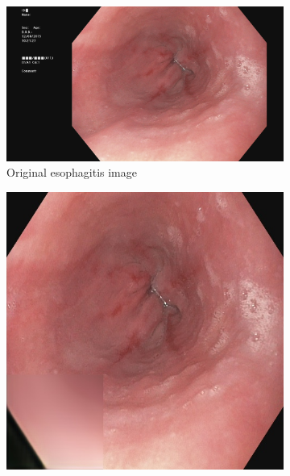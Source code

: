         \begin{figure}[t]
        \tiny
		\begin{subfigure}[t]{\myfigsizethree}
            \centering
            \includegraphics[height=\textwidth ,width=\textwidth]{experiments/figures/512/orig.jpg}
            \caption{Original esophagitis image}    
            \label{fig:ORIG_512}
        \end{subfigure}
        \qquad
        \begin{subfigure}[t]{\myfigsizethree}
            \centering
            \includegraphics[width=\textwidth]{experiments/figures/512/ae.jpg}

\end{subfigure}
\end{figure}
